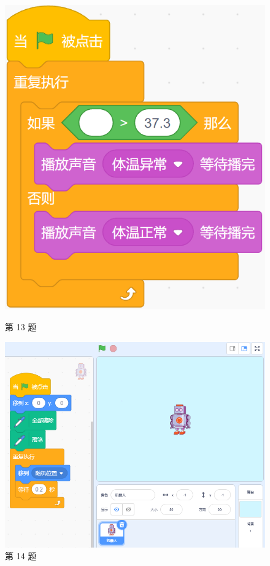 \documentclass[10pt, a4paper]{article}
\begin{document}
\begin{enumerate}
\begin{figure}[htbp]
\begin{minipage}[t]{.2\textwidth}
                \includegraphics[width=\textwidth]{13.png}
                \caption*{第 13 题}
            \end{minipage}
            \begin{minipage}[t]{.33\textwidth}
                \centering
                \includegraphics[width=\textwidth]{14.png}
                \caption*{第 14 题}
            \end{minipage}
        \end{figure}


\end{enumerate}
\end{document}
